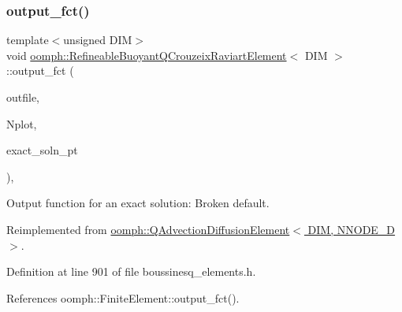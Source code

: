 \subsubsection{\texorpdfstring{output\+\_\+fct()}{output\_fct()}\hspace{0.1cm}{\footnotesize\ttfamily [1/2]}}
{\footnotesize\ttfamily template$<$unsigned D\+IM$>$ \\
void \hyperlink{classoomph_1_1RefineableBuoyantQCrouzeixRaviartElement}{oomph\+::\+Refineable\+Buoyant\+Q\+Crouzeix\+Raviart\+Element}$<$ D\+IM $>$\+::output\+\_\+fct (\begin{DoxyParamCaption}\item[{std\+::ostream \&}]{outfile,  }\item[{const unsigned \&}]{Nplot,  }\item[{\hyperlink{classoomph_1_1FiniteElement_a690fd33af26cc3e84f39bba6d5a85202}{Finite\+Element\+::\+Steady\+Exact\+Solution\+Fct\+Pt}}]{exact\+\_\+soln\+\_\+pt }\end{DoxyParamCaption})\hspace{0.3cm}{\ttfamily [inline]}, {\ttfamily [virtual]}}



Output function for an exact solution\+: Broken default. 



Reimplemented from \hyperlink{classoomph_1_1QAdvectionDiffusionElement_a42d9f526bc4bcc8fe51c6dbb1d216b4c}{oomph\+::\+Q\+Advection\+Diffusion\+Element$<$ D\+I\+M, N\+N\+O\+D\+E\+\_\+D $>$}.



Definition at line 901 of file boussinesq\+\_\+elements.\+h.



References oomph\+::\+Finite\+Element\+::output\+\_\+fct().

\mbox{\label{classoomph_1_1RefineableBuoyantQCrouzeixRaviartElement_aa1eaab23a14039a18701b5666629b5bc}} 
